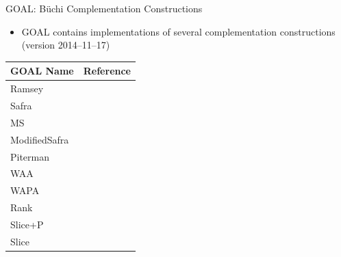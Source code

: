 \documentclass[12pt]{beamer}
\begin{document}
\begin{frame}{GOAL: Büchi Complementation Constructions}
\begin{itemize}
\item GOAL contains implementations of several complementation constructions (version 2014--11--17)
\end{itemize}
\vspace{0.1cm}
\centering
\footnotesize
{\renewcommand{\arraystretch}{1.15}
\begin{tabular}{ll}
\hline
GOAL Name & Reference \\
\hline
Ramsey        & \cite{1985_sistla,PrasadSistla1987217} \\
Safra         & \cite{1988_safra_2,1988_safra_1} \\
MS            & \cite{Muller199569} \\
ModifiedSafra & \cite{2006_althoff} \\
Piterman      & \cite{2006_piterman,2007_piterman} \\
WAA           & \cite{1997_vardi,Kupferman:2001} \\
WAPA          & \cite{1999_thomas} \\
Rank          & \cite{schewe2009buchi} \\
Slice+P       & \cite{vardi2007automata} \\
Slice         & \cite{2008_kaehler} \\
\hline
\end{tabular}}
\end{frame}


\newcommand{\imgshade}[1]{
\tikz \node[inner sep=0,opacity=0.3]{\texttt{[image: \#1]}};}
\newcommand{\imgfull}[1]{
\tikz \node[inner sep=0,opacity=1]{\texttt{[image: \#1]}};}
\end{document}

